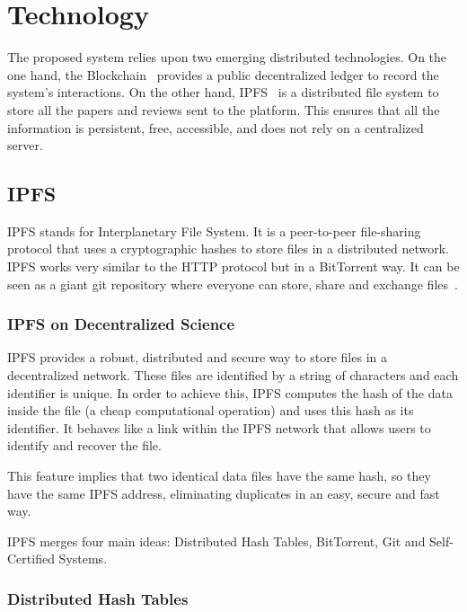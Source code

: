 \section{Technology}
\label{tech}

The proposed system relies upon two emerging distributed technologies. On the
one hand, the Blockchain~\cite{buterin2014ethereum} provides a public
decentralized ledger to record the system's interactions. On the other hand,
IPFS~\cite{benet_ipfs-content_2014} is a distributed file system to store all
the papers and reviews sent to the platform. This ensures that all the
information is persistent, free, accessible, and does not rely on a centralized
server.

\subsection{IPFS}
\label{tech:sec:ipfs}

IPFS stands for Interplanetary File System. It is a peer-to-peer file-sharing
protocol that uses a cryptographic hashes to store files in a distributed
network. IPFS works very similar to the HTTP protocol but in a BitTorrent way.
It can be seen as a giant git repository where everyone can store, share and
exchange files~\cite{benet2014ipfs}.

\subsubsection*{IPFS on Decentralized Science}

IPFS provides a robust, distributed and secure way to store files in a
decentralized network. These files are identified by a string of characters and
each identifier is unique. In order to achieve this, IPFS computes the hash of the
data inside the file (a cheap computational operation) and uses this hash as its
identifier. It behaves like a link within the IPFS network that allows
users to identify and recover the file.

This feature implies that two identical data files have the same hash, so they
have the same IPFS address, eliminating duplicates in an easy, secure and fast
way.

IPFS merges four main ideas: Distributed Hash Tables, BitTorrent, Git and
Self-Certified Systems.

\subsubsection*{Distributed Hash Tables}
\label{tech:sec:ipfs:dht}

